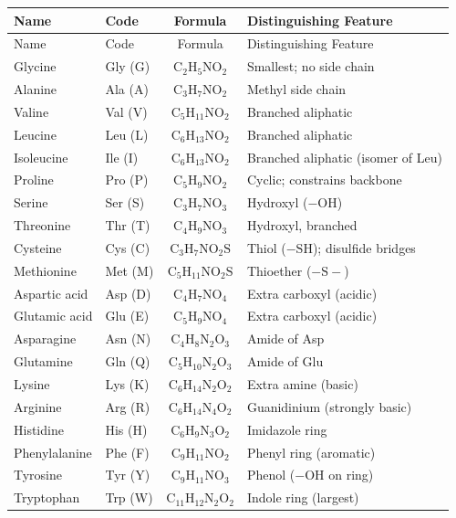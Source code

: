 \documentclass[11pt]{article}
\begin{document}
\begin{longtable}{llcl}
\toprule
Name & Code & Formula & Distinguishing Feature \\
\midrule
\endfirsthead
\toprule
Name & Code & Formula & Distinguishing Feature \\
\midrule
\endhead
\bottomrule
\endfoot
Glycine     & Gly (G) & $\mathrm{C_2H_5NO_2}$     & Smallest; no side chain \\
Alanine     & Ala (A) & $\mathrm{C_3H_7NO_2}$     & Methyl side chain \\
Valine      & Val (V) & $\mathrm{C_5H_{11}NO_2}$  & Branched aliphatic \\
Leucine     & Leu (L) & $\mathrm{C_6H_{13}NO_2}$  & Branched aliphatic \\
Isoleucine  & Ile (I) & $\mathrm{C_6H_{13}NO_2}$  & Branched aliphatic (isomer of Leu) \\
Proline     & Pro (P) & $\mathrm{C_5H_9NO_2}$     & Cyclic; constrains backbone \\
Serine      & Ser (S) & $\mathrm{C_3H_7NO_3}$     & Hydroxyl ($\mathrm{-OH}$) \\
Threonine   & Thr (T) & $\mathrm{C_4H_9NO_3}$     & Hydroxyl, branched \\
Cysteine    & Cys (C) & $\mathrm{C_3H_7NO_2S}$    & Thiol ($\mathrm{-SH}$); disulfide bridges \\
Methionine  & Met (M) & $\mathrm{C_5H_{11}NO_2S}$ & Thioether ($\mathrm{-S-}$) \\
Aspartic acid  & Asp (D) & $\mathrm{C_4H_7NO_4}$  & Extra carboxyl (acidic) \\
Glutamic acid  & Glu (E) & $\mathrm{C_5H_9NO_4}$  & Extra carboxyl (acidic) \\
Asparagine  & Asn (N) & $\mathrm{C_4H_8N_2O_3}$   & Amide of Asp \\
Glutamine   & Gln (Q) & $\mathrm{C_5H_{10}N_2O_3}$ & Amide of Glu \\
Lysine      & Lys (K) & $\mathrm{C_6H_{14}N_2O_2}$ & Extra amine (basic) \\
Arginine    & Arg (R) & $\mathrm{C_6H_{14}N_4O_2}$ & Guanidinium (strongly basic) \\
Histidine   & His (H) & $\mathrm{C_6H_9N_3O_2}$   & Imidazole ring \\
Phenylalanine & Phe (F) & $\mathrm{C_9H_{11}NO_2}$ & Phenyl ring (aromatic) \\
Tyrosine    & Tyr (Y) & $\mathrm{C_9H_{11}NO_3}$  & Phenol ($\mathrm{-OH}$ on ring) \\
Tryptophan  & Trp (W) & $\mathrm{C_{11}H_{12}N_2O_2}$ & Indole ring (largest) \\
\end{longtable}
\end{document}
